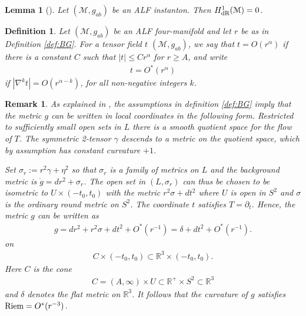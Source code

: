 \documentclass[a4paper,10pt,reqno]{amsart}
\newcommand{\Reals}{\mathbb{R}}
\newcommand{\Riem}{\mathop{\rm Riem}}
\newcommand{\cM}{\mathcal{M}}
\theoremstyle{plain}
\newtheorem{lemma}[thm]{Lemma}
\newtheorem{definition}[thm]{Definition}
\newtheorem{remark}[thm]{Remark}
\newcommand{\gring}{\mathring{g}}
\numberwithin{equation}{section}
\begin{document}
\begin{lemma}[] \label{lem:H1zero} 
Let $(\cM, g_{ab})$ be an ALF instanton. Then $H^1_{\text{\rm dR}}(\cM) = 0$. 
\end{lemma} 

\begin{definition}%
\label{def:ordo} 
Let $(\cM, g_{ab})$ be an ALF four-manifold and let $r$ be as in Definition \ref{def:BG}. For a tensor field $t$ $(\cM, g_{ab})$, we say that  $t =  O(r^\alpha)$ if  there is a constant $C$ such that $|t| \leq C r^\alpha$ for $r \geq A$, and write 
\begin{align} 
t = O^*(r^\alpha)
\end{align} 
if $|\nabla^k t| = O(r^{\alpha-k})$, for all non-negative integers $k$. 
\end{definition} 


\begin{remark}\label{rem:cone}   
As explained in \cite[Proof~of~Prop.~1.5]{Biquard:Gauduchon}, the assumptions in definition \ref{def:BG} imply that the metric $g$ can be written in local coordinates in the following form. Restricted to sufficiently small open sets in $L$ there is a smooth quotient space for the flow of $T$. The symmetric 2-tensor $\gamma$ descends to a metric on the quotient space, which by assumption has constant curvature $+1$. 

Set $\sigma_r := r^2\gamma + \eta^2$ so that $\sigma_r$ is a family of metrics on $L$ and the background metric is $\gring = dr^2 + \sigma_r$. The open set in $(L,\sigma_r)$ can thus be chosen to be isometric to $U \times (-t_0,t_0)$ with the metric $r^2 \sigma + dt^2$  where $U$ is open in $S^2$ and $\sigma$ is the ordinary round metric on $S^2$. The coordinate $t$ satisfies $T = \partial_t$. Hence, the metric $g$ can be written as 
\begin{align} 
g = dr^2 + r^2 \sigma + dt^2 + O^*(r^{-1})
= \delta + dt^2 + O^*(r^{-1}).
\end{align} 
on 
\begin{align} 
C \times (-t_0,t_0) \subset \Reals^3 \times (-t_0,t_0). 
\end{align} 
Here $C$ is the cone 
\begin{align} 
C = (A, \infty) \times U \subset \Reals^+ \times S^2 \subset \Reals^3  
\end{align} 
and $\delta$ denotes the flat metric on $\Reals^3$. 
It follows that the curvature of $g$ satisfies $\Riem = O^*(r^{-3})$.
\end{remark} 
\end{document}
